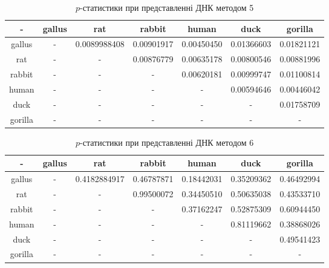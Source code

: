 \documentclass[14pt,a4paper,titlepage]{extarticle}
\begin{document}
\begin{table}[h!]
\begin{center}
\begin{tabular}{|c|c|c|c|c|c|c|}
\hline
- & gallus & rat & rabbit & human & duck & gorilla \\ \hline
gallus & - & 0.0089988408 & 0.00901917 & 0.00450450 & 0.01366603 & 0.01821121 \\ \hline
rat & - & - & 0.00876779 & 0.00635178 & 0.00800546 & 0.00881996 \\ \hline
rabbit & - & - & - & 0.00620181 & 0.00999747 & 0.01100814 \\ \hline
human & - & - & - & - & 0.00594646 & 0.00446042 \\ \hline
duck & - & - & - & - & - & 0.01758709 \\ \hline
gorilla & - & - & - & - & - & - \\ \hline
\end{tabular}
\end{center}
\caption{$p$-статистики при представленні ДНК методом 5}
\label{table:res5}
\end{table}

\begin{table}[h!]
\begin{center}
\begin{tabular}{|c|c|c|c|c|c|c|}
\hline
- & gallus & rat & rabbit & human & duck & gorilla \\ \hline
gallus & - & 0.4182884917 & 0.46787871 & 0.18442031 & 0.35209362 & 0.46492994 \\ \hline
rat & - & - & 0.99500072 & 0.34450510 & 0.50635038 & 0.43533710 \\ \hline
rabbit & - & - & - & 0.37162247 & 0.52875309 & 0.60944450 \\ \hline
human & - & - & - & - & 0.81119662 & 0.38868026 \\ \hline
duck & - & - & - & - & - & 0.49541423 \\ \hline
gorilla & - & - & - & - & - & - \\ \hline
\end{tabular}
\end{center}
\caption{$p$-статистики при представленні ДНК методом 6}
\label{table:res6}
\end{table}

\newpage
\end{document}
